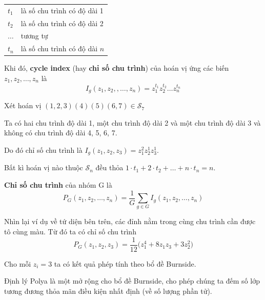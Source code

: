\begin{table}
    \begin{tabularx}{\textwidth}
        {>{\raggedright\arraybackslash\hsize=0.1\textwidth}X >{\raggedright\arraybackslash}X}
        $t_1$ & là số chu trình có độ dài 1 \\
        $t_2$ & là số chu trình có độ dài 2 \\
        $\ldots$ & tương tự \\
        $t_n$ & là số chu trình có độ dài $n$
    \end{tabularx}
\end{table}

Khi đó, \textbf{cycle index} (hay \textbf{chỉ số chu trình}) của hoán vị ứng các biến $z_1, z_2, \ldots, z_n$ là
\begin{equation*}
    I_g (z_1, z_2, ,\ldots, z_n) = z_1^{t_1} z_2^{t_2} \ldots z_n^{t_n}
\end{equation*}

\begin{example}
Xét hoán vị $(1,2,3)(4)(5)(6,7) \in \mathcal{S}_7$

Ta có hai chu trình độ dài 1, một chu trình độ dài 2 và một chu trình độ dài 3 và không có chu trình độ dài 4, 5, 6, 7.

Do đó chỉ số chu trình là $I_g (z_1, z_2, z_3) = z_1^2 z_2^1 z_3^1$.

\end{example}

\begin{remark}
    Bất kì hoán vị nào thuộc $\mathcal{S}_n$ đều thỏa $1 \cdot t_1 + 2 \cdot t_2 + \ldots + n \cdot t_n = n$.
\end{remark}

\begin{definition}
    \textbf{Chỉ số chu trình} của nhóm G là
    \[P_G (z_1, z_2, \ldots, z_n) = \frac{1}{G}\sum_{g \in G} I_g (z_1, z_2, \ldots, z_n)\]
\end{definition}

Nhìn lại ví dụ về tứ diện bên trên, các đỉnh nằm trong cùng chu trình cần được tô cùng màu. Từ đó ta có chỉ số chu trình
\begin{equation*}
    P_G(z_1, z_2, z_3) = \frac{1}{12}\big(z_1^4 + 8 z_1 z_3 + 3 z_2^2\big)
\end{equation*}

Cho mỗi $z_i = 3$ ta có kết quả phép tính theo bổ đề Burnside.

Định lý Polya là một mở rộng cho bổ đề Burnside, cho phép chúng ta đếm số lớp tương đương thỏa mãn điều kiện nhất định (về số lượng phần tử).

